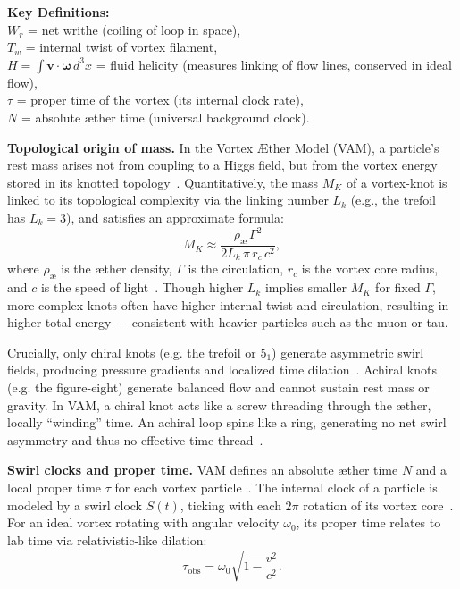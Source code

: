 \documentclass[11pt]{article}
\begin{document}
\textbf{Key Definitions:} \\
$W_r$ = net writhe (coiling of loop in space),\\
$T_w$ = internal twist of vortex filament,\\
$H = \int \mathbf{v}\cdot\boldsymbol{\omega}\,d^3x$ = fluid helicity (measures linking of flow lines, conserved in ideal flow),\\
$\tau$ = proper time of the vortex (its internal clock rate),\\
$N$ = absolute æther time (universal background clock).

\textbf{Topological origin of mass.} In the Vortex Æther Model (VAM), a particle’s rest mass arises not from coupling to a Higgs field, but from the vortex energy stored in its knotted topology~\cite{iskandarani2025vam5}. Quantitatively, the mass $M_K$ of a vortex-knot is linked to its topological complexity via the linking number $L_k$ (e.g., the trefoil has $L_k = 3$), and satisfies an approximate formula:
\[
M_K \approx \frac{\rho_{\text{\ae}}\, \Gamma^2}{2 L_k\, \pi\, r_c\, c^2},
\]
where $\rho_{\text{\ae}}$ is the æther density, $\Gamma$ is the circulation, $r_c$ is the vortex core radius, and $c$ is the speed of light~\cite{iskandarani2025vam5}. Though higher $L_k$ implies smaller $M_K$ for fixed $\Gamma$, more complex knots often have higher internal twist and circulation, resulting in higher total energy — consistent with heavier particles such as the muon or tau.

Crucially, only chiral knots (e.g. the trefoil or $5_1$) generate asymmetric swirl fields, producing pressure gradients and localized time dilation~\cite{iskandarani2025vam5}. Achiral knots (e.g. the figure-eight) generate balanced flow and cannot sustain rest mass or gravity. In VAM, a chiral knot acts like a screw threading through the æther, locally “winding” time. An achiral loop spins like a ring, generating no net swirl asymmetry and thus no effective time-thread~\cite{iskandarani2025vam5}.

\textbf{Swirl clocks and proper time.} VAM defines an absolute æther time $N$ and a local proper time $\tau$ for each vortex particle~\cite{iskandarani2025vam1}. The internal clock of a particle is modeled by a swirl clock $S(t)$, ticking with each $2\pi$ rotation of its vortex core~\cite{iskandarani2025vam1}. For an ideal vortex rotating with angular velocity $\omega_0$, its proper time relates to lab time via relativistic-like dilation:
\[
\tau_{\text{obs}} = \omega_0 \sqrt{1 - \frac{v^2}{c^2}}.
\]
\end{document}
